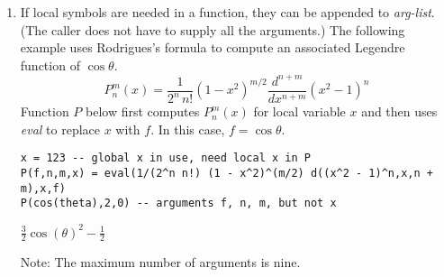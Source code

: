 \begin{enumerate}
\item
If local symbols are needed in a function, they can be appended to {\it arg-list}.
(The caller does not have to supply all the arguments.)
The following example uses Rodrigues's formula to
compute an associated Legendre function of $\cos\theta$.
\begin{equation*}
P_n^m(x)=\frac{1}{2^n\,n!}(1-x^2)^{m/2}\frac{d^{n+m}}{dx^{n+m}}(x^2-1)^n
\end{equation*}
Function $P$ below first computes $P_n^m(x)$ for local variable
$x$ and then uses {\it eval} to replace $x$ with $f$.
In this case, $f=\cos\theta$.

\begin{Verbatim}[formatcom=\color{blue}]
x = 123 -- global x in use, need local x in P
P(f,n,m,x) = eval(1/(2^n n!) (1 - x^2)^(m/2) d((x^2 - 1)^n,x,n + m),x,f)
P(cos(theta),2,0) -- arguments f, n, m, but not x
\end{Verbatim}

\noindent
$\displaystyle \tfrac{3}{2} \cos(\theta)^2-\tfrac{1}{2}$

\bigskip
\noindent
Note: The maximum number of arguments is nine.

\end{enumerate}
